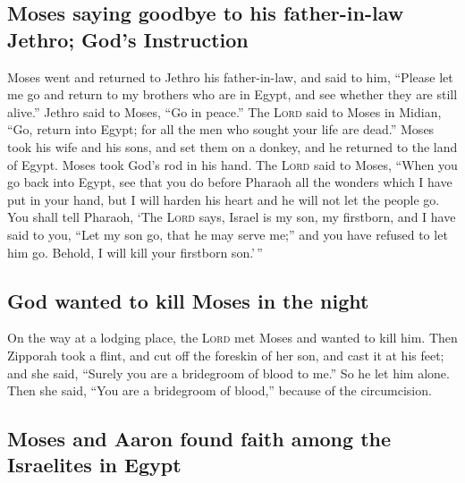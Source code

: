 \hypertarget{moses-saying-goodbye-to-his-father-in-law-jethro-gods-instruction}{%
\subsection{Moses saying goodbye to his father-in-law Jethro; God's
Instruction}\label{moses-saying-goodbye-to-his-father-in-law-jethro-gods-instruction}}

 Moses went and returned to Jethro his father-in-law, and
said to him, ``Please let me go and return to my brothers who are in
Egypt, and see whether they are still alive.'' Jethro said to Moses,
``Go in peace.''  The \textsc{Lord} said to Moses in
Midian, ``Go, return into Egypt; for all the men who sought your life
are dead.''  Moses took his wife and his sons, and set
them on a donkey, and he returned to the land of Egypt. Moses took God's
rod in his hand.  The \textsc{Lord} said to Moses, ``When
you go back into Egypt, see that you do before Pharaoh all the wonders
which I have put in your hand, but I will harden his heart and he will
not let the people go.  You shall tell Pharaoh, `The
\textsc{Lord} says, Israel is my son, my firstborn,  and
I have said to you, ``Let my son go, that he may serve me;'' and you
have refused to let him go. Behold, I will kill your firstborn son.'\,''

\hypertarget{god-wanted-to-kill-moses-in-the-night}{%
\subsection{God wanted to kill Moses in the
night}\label{god-wanted-to-kill-moses-in-the-night}}

 On the way at a lodging place, the \textsc{Lord} met
Moses and wanted to kill him.  Then Zipporah took a
flint, and cut off the foreskin of her son, and cast it at his feet; and
she said, ``Surely you are a bridegroom of blood to me.''
 So he let him alone. Then she said, ``You are a
bridegroom of blood,'' because of the circumcision.

\hypertarget{moses-and-aaron-found-faith-among-the-israelites-in-egypt}{%
\subsection{Moses and Aaron found faith among the Israelites in
Egypt}\label{moses-and-aaron-found-faith-among-the-israelites-in-egypt}}

